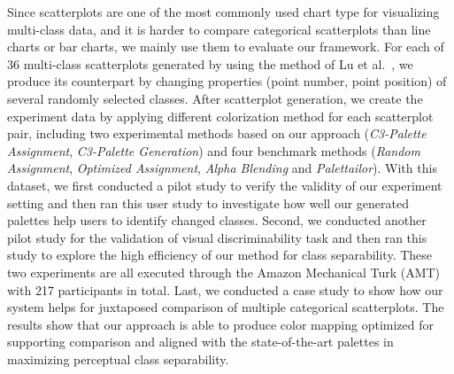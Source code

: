 Since scatterplots are one of the most commonly used chart type for visualizing multi-class data, and it is harder to compare categorical scatterplots than line charts or bar charts, we mainly use them to evaluate our framework. For each of 36 multi-class scatterplots generated by using the method of Lu et al.~\cite{Lu21}, we produce its counterpart by changing properties (point number, point position) of several randomly selected classes. After scatterplot generation, we create the experiment data by applying different colorization method for each scatterplot pair, including two experimental methods based on our approach (\emph{C3-Palette Assignment}, \emph{C3-Palette Generation}) and four benchmark methods (\emph{Random Assignment}, \emph{Optimized Assignment}, \emph{Alpha Blending} and \emph{Palettailor}). With this dataset, we first conducted a pilot study to verify the validity of our experiment setting and then ran this user study to investigate how well our generated palettes help users to identify changed classes.
Second, we conducted another pilot study for the validation of visual discriminability task and then ran this study to explore the high efficiency of our method for class separability. 
These two experiments are all executed through the Amazon Mechanical Turk (AMT) with 217 participants in total.  
Last, we conducted a case study to show how our system helps for juxtaposed comparison of multiple categorical scatterplots.
The results show that our approach is able to produce color mapping optimized for supporting comparison and aligned with the state-of-the-art palettes in maximizing perceptual class separability.

